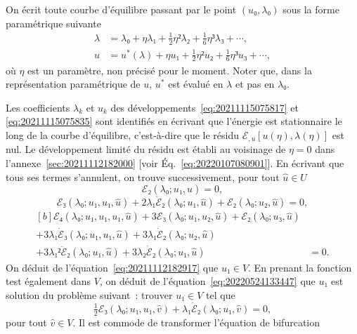 \documentclass[12pt, final]{scrartcl}
\theoremstyle{definition}
\begin{document}
On écrit toute courbe d'équilibre passant par le point \((u₀, λ₀)\) sous la
forme paramétrique suivante
\begin{align}
  \label{eq:20211115075817}
  λ &=  λ₀ + η λ₁ + \tfrac{1}{2} η² λ₂ + \tfrac{1}{6} η³ λ₃ + \cdots,\\
  \label{eq:20211115075835}
  u &= u^{\ast}(λ) + η u₁ + \tfrac{1}{2} η² u₂ + \tfrac{1}{6} η³ u₃ + \cdots,
\end{align}
où \(η\) est un paramètre, non précisé pour le moment. Noter que, dans la
représentation paramétrique de \(u\), \(u^{\ast}\) est évalué en \(λ\) et pas en
\(λ₀\).

Les coefficients \(λ_k\) et \(u_k\) des développements~\eqref{eq:20211115075817}
et \eqref{eq:20211115075835} sont identifiés en écrivant que l'énergie est
stationnaire le long de la courbe d'équilibre, c'est-à-dire que le résidu
\(ℰ_{, u} [u(η), λ(η)]\) est nul. Le développement limité du résidu est établi
au voisinage de \(η = 0\) dans l'annexe~\ref{sec:20211112182000} [voir
Éq.~\eqref{eq:20220107080901}]. En écrivant que tous ses termes s'annulent, on
trouve successivement, pour tout \(\hat{u}∈U\)
\begin{equation}
  \label{eq:20211112182917}
  ℰ₂(λ₀; u₁, \hat{u}) = 0,
\end{equation}
\begin{equation}
  \label{eq:20220524133447}
  ℰ₃(λ₀; u₁, u₁, \hat{u}) + 2λ₁\dot{ℰ}₂(λ₀; u₁, \hat{u}) + ℰ₂(λ₀; u₂, \hat{u}) = 0,
\end{equation}
\begin{equation}
  \label{eq:res3}
  \begin{aligned}[b]
    ℰ₄(λ₀; u₁, u₁, u₁, \hat{u}) + 3ℰ₃(λ₀; u₁, u₂, \hat{u}) + ℰ₂(λ₀; u₃, \hat{u})&\\
    + 3λ₁\dot{ℰ}₃(λ₀; u₁, u₁, \hat{u}) + 3λ₁\dot{ℰ}₂(λ₀;  u₂, \hat{u})&\\
    + 3λ₁²\ddot{ℰ}₂(λ₀; u₁, \hat{u}) + 3λ₂\dot{ℰ}₂(λ₀; u₁, \hat{u}) & = 0.
  \end{aligned}
\end{equation}
On déduit de l'équation~\eqref{eq:20211112182917} que \(u₁∈V\). En prenant la
fonction test également dans \(V\), on déduit de
l'équation~\eqref{eq:20220524133447} que \(u₁\) est solution du problème
suivant~: trouver \(u₁∈V\) tel que
\begin{equation}
  \label{eq:20220524133816}
  \tfrac{1}{2} ℰ₃(λ₀; u₁, u₁, \hat{v}) + λ₁\dot{ℰ}₂(λ₀; u₁, \hat{v}) = 0,
\end{equation}
pour tout \(\hat{v}∈V\). Il est commode de transformer l'équation de bifurcation
\end{document}
